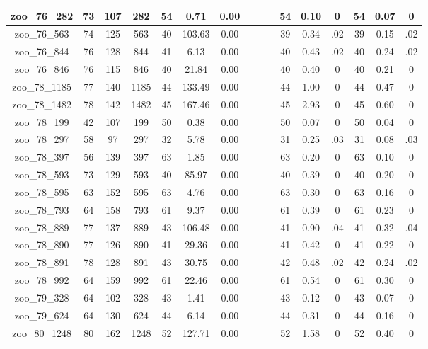 \begin{landscape}
\begin{longtable}{|c|c|c|c|c|c|c|c|c|c|c|c|c|c|c|c|}
zoo\_76\_282 & 73 & 107 & 282 & 54 & 0.71 & 0.00 &  &  &  & 54 & 0.10 & 0 & 54 & 0.07 & 0 \\ \hline 
zoo\_76\_563 & 74 & 125 & 563 & 40 & 103.63 & 0.00 &  &  &  & 39 & 0.34 & .02 & 39 & 0.15 & .02 \\ \hline 
zoo\_76\_844 & 76 & 128 & 844 & 41 & 6.13 & 0.00 &  &  &  & 40 & 0.43 & .02 & 40 & 0.24 & .02 \\ \hline 
zoo\_76\_846 & 76 & 115 & 846 & 40 & 21.84 & 0.00 &  &  &  & 40 & 0.40 & 0 & 40 & 0.21 & 0 \\ \hline 
zoo\_78\_1185 & 77 & 140 & 1185 & 44 & 133.49 & 0.00 &  &  &  & 44 & 1.00 & 0 & 44 & 0.47 & 0 \\ \hline 
zoo\_78\_1482 & 78 & 142 & 1482 & 45 & 167.46 & 0.00 &  &  &  & 45 & 2.93 & 0 & 45 & 0.60 & 0 \\ \hline 
zoo\_78\_199 & 42 & 107 & 199 & 50 & 0.38 & 0.00 &  &  &  & 50 & 0.07 & 0 & 50 & 0.04 & 0 \\ \hline 
zoo\_78\_297 & 58 & 97 & 297 & 32 & 5.78 & 0.00 &  &  &  & 31 & 0.25 & .03 & 31 & 0.08 & .03 \\ \hline 
zoo\_78\_397 & 56 & 139 & 397 & 63 & 1.85 & 0.00 &  &  &  & 63 & 0.20 & 0 & 63 & 0.10 & 0 \\ \hline 
zoo\_78\_593 & 73 & 129 & 593 & 40 & 85.97 & 0.00 &  &  &  & 40 & 0.39 & 0 & 40 & 0.20 & 0 \\ \hline 
zoo\_78\_595 & 63 & 152 & 595 & 63 & 4.76 & 0.00 &  &  &  & 63 & 0.30 & 0 & 63 & 0.16 & 0 \\ \hline 
zoo\_78\_793 & 64 & 158 & 793 & 61 & 9.37 & 0.00 &  &  &  & 61 & 0.39 & 0 & 61 & 0.23 & 0 \\ \hline 
zoo\_78\_889 & 77 & 137 & 889 & 43 & 106.48 & 0.00 &  &  &  & 41 & 0.90 & .04 & 41 & 0.32 & .04 \\ \hline 
zoo\_78\_890 & 77 & 126 & 890 & 41 & 29.36 & 0.00 &  &  &  & 41 & 0.42 & 0 & 41 & 0.22 & 0 \\ \hline 
zoo\_78\_891 & 78 & 128 & 891 & 43 & 30.75 & 0.00 &  &  &  & 42 & 0.48 & .02 & 42 & 0.24 & .02 \\ \hline 
zoo\_78\_992 & 64 & 159 & 992 & 61 & 22.46 & 0.00 &  &  &  & 61 & 0.54 & 0 & 61 & 0.30 & 0 \\ \hline 
zoo\_79\_328 & 64 & 102 & 328 & 43 & 1.41 & 0.00 &  &  &  & 43 & 0.12 & 0 & 43 & 0.07 & 0 \\ \hline 
zoo\_79\_624 & 64 & 130 & 624 & 44 & 6.14 & 0.00 &  &  &  & 44 & 0.31 & 0 & 44 & 0.16 & 0 \\ \hline 
zoo\_80\_1248 & 80 & 162 & 1248 & 52 & 127.71 & 0.00 &  &  &  & 52 & 1.58 & 0 & 52 & 0.40 & 0 \\ \hline 

\end{longtable}
\end{landscape}
